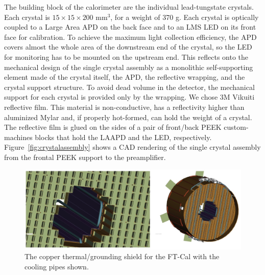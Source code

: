 The building block of the calorimeter are the
individual lead-tungstate crystals. Each crystal
is $15\times 15\times200$ mm$^3$, for a weight of
370 g.
Each crystal is optically coupled
to a Large Area APD on the back face  and to an LMS LED on its front face for calibration. To achieve the maximum
light collection efficiency, the APD covers
almost the whole area of the downstream
end of the crystal, so the LED for monitoring
has to be mounted on the upstream end. This
reflects onto the mechanical design of the single
crystal assembly 
as a monolithic self-supporting element made of
the crystal itself, the APD, the reflective wrapping,
 and the crystal support structure.
To avoid dead volume in the detector,
the mechanical support for each crystal is provided only by the wrapping. We chose 3M Vikuiti reflective film. This material is non-conductive, has a reflectivity higher
than aluminized Mylar and, if properly
hot-formed, can hold the weight of a crystal. The reflective film is glued on the sides of a pair of front/back PEEK custom-machines blocks that hold the LAAPD and the LED, respectively. Figure~\ref{fig:crystalassembly} shows a CAD rendering of the single
crystal assembly from the frontal PEEK support
to the  preamplifier.
\begin{figure}[th!]
\centering 
\includegraphics[width=1.0\columnwidth]{./fig/raff.jpeg}
\caption{The copper thermal/grounding shield for the FT-Cal with the cooling pipes shown.}
\label{fig:piping} 
\end{figure}

